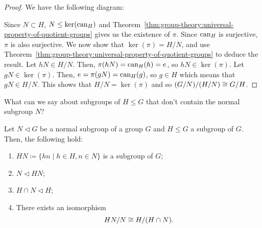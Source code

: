 \begin{proof}
  We have the following diagram:
  \begin{center}
  \end{center}

  Since \(N \subset H\), \(N \leq \ker(\operatorname{can}_{H})\) and Theorem~\ref{thm:group-theory:universal-property-of-quotient-groups} gives us the existence of \(\pi\).
  Since \(\operatorname{can}_{H}\) is surjective, \(\pi\) is also surjective.
  We now show that \(\ker(\pi) = H/N\), and use Theorem~\ref{thm:group-theory:universal-property-of-quotient-groups} to deduce the result.
  Let \(hN \in H/N\).
  Then, \(\pi(hN) = \operatorname{can}_{H}(h) = e\), so \(hN \in \ker(\pi)\).
  Let \(gN \in \ker(\pi)\).
  Then, \(e = \pi(gN) = \operatorname{can}_{H}(g)\), so \(g \in H\) which means that \(gN \in H/N\).
  This shows that \(H/N = \ker(\pi)\) and so \((G/N) / (H/N) \cong G/H\).
\end{proof}

What can we say about subgroups of \(H \leq G\) that don't contain the normal subgroup \(N\)?

\begin{theorem}
 \label{thm:group-theory:second-isomorphism-theorem}
 Let \(N \triangleleft G\) be a normal subgroup of a group \(G\) and  \(H \leq G\) a subgroup of \(G\).
 Then, the following hold:
 \begin{enumerate}
 \item
   \(HN \coloneqq \{hn \mid h \in H, n \in N\}\) is a subgroup of \(G\);
 \item
   \(N \triangleleft HN\);
 \item
   \(H \cap N \triangleleft H\);
 \item
   There exists an isomorphism
   \[HN/N \cong H/(H\cap N).\]
 \end{enumerate}
\end{theorem}

